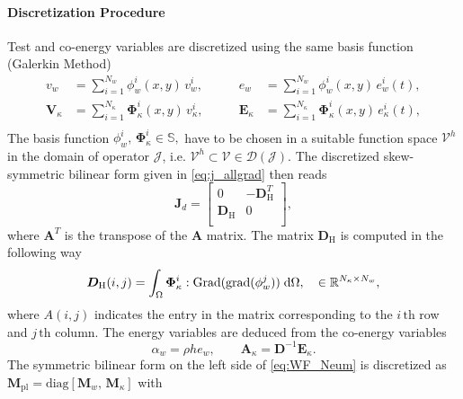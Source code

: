 \documentclass[letterpaper, 10 pt, conference]{ieeeconf}
\begin{document}
\paragraph{Discretization Procedure}
Test and co-energy variables are discretized using the same basis function (Galerkin Method)
\begin{equation}
\begin{aligned}
v_w &= \sum_{i = 1}^{N_w} \phi_w^i(x,y) \, v_w^i, \\
\bm{V}_\kappa &= \sum_{i = 1}^{N_\kappa} \bm\Phi_\kappa^i(x,y) \, v_\kappa^i,\\
\end{aligned} \qquad 
\begin{aligned}
e_w &= \sum_{i = 1}^{N_w} \phi_w^i(x,y) \, e_w^i(t), \\
\bm{E}_\kappa &= \sum_{i = 1}^{N_\kappa} \bm\Phi_\kappa^i(x,y) \, e_\kappa^i(t),\\
\end{aligned}
\end{equation}
The basis function $\phi_w^i, \, \bm\Phi_\kappa^i \in \mathbb{S}, $ have to be chosen in a suitable function space $\mathcal{V}^h$ in the domain of operator $\mathcal{J}$, i.e. $\mathcal{V}^h \subset \mathcal{V} \in \mathcal{D}(\mathcal{J})$. The discretized skew-symmetric bilinear form given in \eqref{eq:j_allgrad} then reads
\begin{equation}
\bm{J}_d = 
\begin{bmatrix}
0 & -\bm{D}_{\mathrm{H}}^T \\
\bm{D}_{\mathrm{H}} & 0\\
\end{bmatrix},
\end{equation}
where $\bm{A}^T$ is the transpose of the $\bm{A}$ matrix. The matrix $\bm{D}_{\mathrm{H}}$ is computed in the following way
\begin{equation}
\bm{D}_{\mathrm{H}}(i,j) = \int_{\Omega} \bm{\Phi}_{\kappa}^i : \mathrm{Grad}(\mathrm{grad}(\phi_w^j)) \d\Omega, \quad \in \mathbb{R}^{N_\kappa \times N_w},
\end{equation}
where $A(i,j)$ indicates the entry in the matrix corresponding to the $i \, {\text{th}}$ row and $j \,{\text{th}}$ column. The energy variables are deduced from the co-energy variables 
\begin{equation}
\alpha_w = \rho h e_w, \qquad \bm{A}_{\kappa} = \bm{D}^{-1} \bm{E}_{\kappa}.
\end{equation}
The symmetric bilinear form on the left side of \eqref{eq:WF_Neum} is discretized as $\bm{M}_{\text{pl}} = \text{diag}[\bm{M}_w,\, \bm{M}_\kappa]$ with
\end{document}
